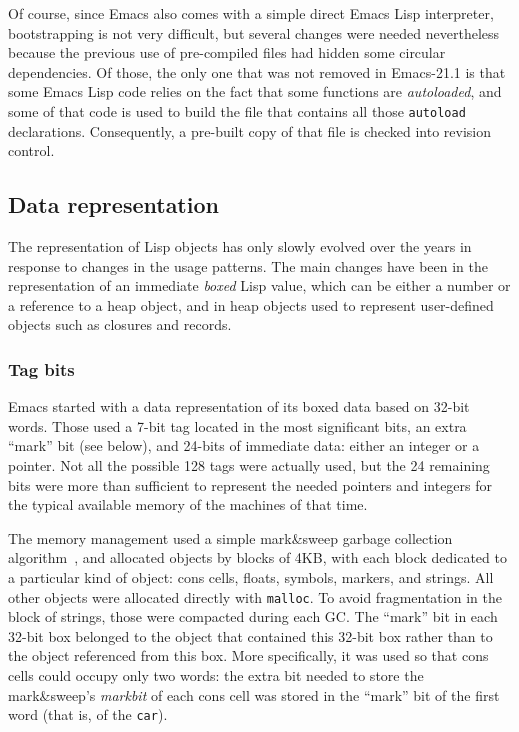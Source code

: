 \documentclass[format=acmsmall, review]{acmart}
\newcommand \Elisp {Emacs Lisp}
\begin{document}
Of course, since Emacs also comes with a simple direct \Elisp{} interpreter,
bootstrapping is not very difficult, but several changes were needed
nevertheless because the previous use of pre-compiled files had hidden some
circular dependencies.  Of those, the only one that was not removed in
Emacs-21.1 is that some \Elisp{} code relies on the fact that some
functions are \emph{autoloaded}, and some of that code is used to build the
file that contains all those \texttt{autoload} declarations.  Consequently,
a pre-built copy of that file is checked into revision control.

\subsection{Data representation}
\label{sec:data-representation}

The representation of Lisp objects has only slowly evolved over the years in
response to changes in the usage patterns.  The main changes have been in
the representation of an immediate \emph{boxed} Lisp value, which can be
either a number or a reference to a heap object, and in heap objects used to
represent user-defined objects such as closures and records.

\subsubsection{Tag bits}
Emacs started with a data representation of its boxed data based on 32-bit
words.  Those used a 7-bit tag located in the most significant bits, an extra
``mark'' bit (see below), and 24-bits of immediate data: either an integer or
a pointer.  Not all the possible 128 tags were actually used, but the 24
remaining bits were more than sufficient to represent the needed pointers and
integers for the typical available memory of the machines of that time.

The memory management used a simple mark\&sweep garbage collection
algorithm~\cite{McCarthy1960}, and allocated objects by blocks of 4\;KB,
with each block dedicated to a particular
kind of object: cons cells, floats, symbols, markers, and
strings. All other objects were allocated directly with \texttt{malloc}.
To avoid fragmentation in the block of strings, those were compacted during
each GC.  The ``mark'' bit in each 32-bit box belonged to the object
that contained this 32-bit box rather than to the object referenced from
this box.  More specifically, it was used so that cons cells could
occupy only two words: the extra bit needed to store the mark\&sweep's
\emph{markbit} of each cons cell was stored in the ``mark'' bit of the first
word (that is, of the \texttt{car}).
\end{document}
